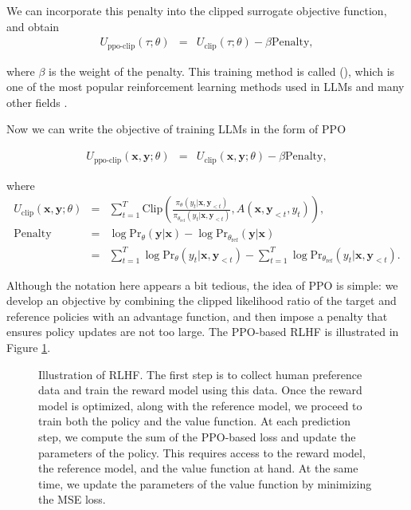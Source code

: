 We can incorporate this penalty into the clipped surrogate objective function, and obtain
\begin{eqnarray}
U_{\mathrm{ppo\text{-}clip}}(\tau;\theta) & = & U_{\mathrm{clip}}(\tau;\theta) - \beta \mathrm{Penalty},
\end{eqnarray}

\noindent where $\beta$ is the weight of the penalty. This training method is called  (), which is one of the most popular reinforcement learning methods used in LLMs and many other fields \cite{schulman-etal:2017proximal}.

Now we can write the objective of training LLMs in the form of PPO

\begin{eqnarray}
U_{\mathrm{ppo\text{-}clip}}(\mathbf{x},\mathbf{y};\theta) & = & U_{\mathrm{clip}}(\mathbf{x},\mathbf{y};\theta) - \beta \mathrm{Penalty} \label{eq:ppo-objective-llm},
\end{eqnarray}

\noindent where
\begin{eqnarray}
U_{\mathrm{clip}}(\mathbf{x},\mathbf{y};\theta) & = & \sum_{t=1}^{T} \mathrm{Clip}\left( \frac{\pi_{\theta}(y_t|\mathbf{x},\mathbf{y}_{<t})}{\pi_{\theta_{\mathrm{ref}}}(y_t|\mathbf{x},\mathbf{y}_{<t})}, A(\mathbf{x},\mathbf{y}_{<t},y_t)  \right), \\
\mathrm{Penalty} & = & \log \mathrm{Pr}_{\theta}(\mathbf{y}|\mathbf{x}) - \log \mathrm{Pr}_{\theta_{\mathrm{ref}}}(\mathbf{y}|\mathbf{x}) \nonumber \\
                 & = & \sum_{t=1}^{T} \log \mathrm{Pr}_{\theta}(y_t|\mathbf{x},\mathbf{y}_{<t}) - \sum_{t=1}^{T} \log \mathrm{Pr}_{\theta_{\mathrm{ref}}}(y_t|\mathbf{x},\mathbf{y}_{<t}).
\end{eqnarray}

Although the notation here appears a bit tedious, the idea of PPO is simple: we develop an objective by combining the clipped likelihood ratio of the target and reference policies with an advantage function, and then impose a penalty that ensures policy updates are not too large. The PPO-based RLHF is illustrated in Figure \ref{fig:ppo-rlhf}.

\begin{figure}[!t]
\centering

\caption{Illustration of RLHF. The first step is to collect human preference data and train the reward model using this data. Once the reward model is optimized, along with the reference model, we proceed to train both the policy and the value function. At each prediction step, we compute the sum of the PPO-based loss and update the parameters of the policy. This requires access to the reward model, the reference model, and the value function at hand. At the same time, we update the parameters of the value function by minimizing the MSE loss.}
\label{fig:ppo-rlhf}
\end{figure}

